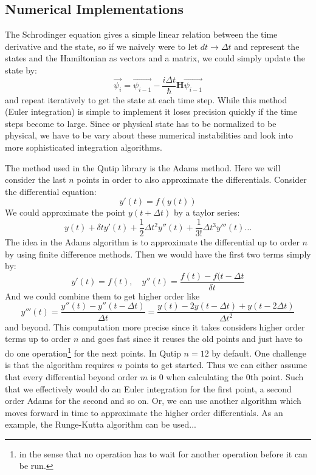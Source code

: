 \subsection{Numerical Implementations}\label{sec:numerical_implementations}
The Schrodinger equation gives a simple linear relation between the time derivative and the state, so if we naively were to let $dt\to\Delta t$ and represent the states and the Hamiltonian as vectors and a matrix, we could simply update the state by:
\begin{equation}
    \Vec{\psi_i} =  \Vec{\psi_{i-1}} - \frac{i\Delta t}{\hbar}\boldsymbol{H} \Vec{\psi_{i - 1}}
\end{equation}
and repeat iteratively to get the state at each time step. While this method (Euler integration) is simple to implement it loses precision quickly if the time steps become to large. Since or physical state has to be normalized to be physical, we have to be vary about these numerical instabilities and look into more sophisticated integration algorithms.

The method used in the Qutip library is the Adams method. Here we will consider the last $n$ points in order to also approximate the differentials. Consider the differential equation:
\begin{equation}
    y'(t) = f(y(t))
\end{equation}
We could approximate the point $y(t+\Delta t)$ by a taylor series:
\begin{equation}
    y(t) + \delta t y'(t) + \frac12 \Delta t^2 y''(t) + \frac{1}{3!} \Delta t^3 y'''(t)\dots 
\end{equation}
The idea in the Adams algorithm is to approximate the differential up to order $n$ by using finite difference methods. Then we would have the first two terms simply by:
\begin{equation}
    y'(t) = f(t), \quad y''(t) = \frac{f(t) - f(t - \Delta t}{\delta t} 
\end{equation}
And we could combine them to get higher order like
\begin{equation}
    y'''(t) = \frac{y''(t) - y''(t-\Delta t)}{\Delta t} = \frac{y(t) - 2y(t-\Delta t) + y(t-2\Delta t)}{\Delta t^2}
\end{equation}
and beyond. This computation more precise since it takes considers higher order terms up to order $n$ and goes fast since it reuses the old points and just have to do one operation\footnote{in the sense that no operation has to wait for another operation before it can be run.} for the next points. In Qutip $n=12$ by default. One challenge is that the algorithm requires $n$ points to get started. Thus we can either assume that every differential beyond order $m$ is $0$ when calculating the $0$th point. Such that we effectively would do an Euler integration for the first point, a second order Adams for the second and so on. Or, we can use another algorithm which moves forward in time to approximate the higher order differentials. As an example, the Runge-Kutta algorithm can be used...

